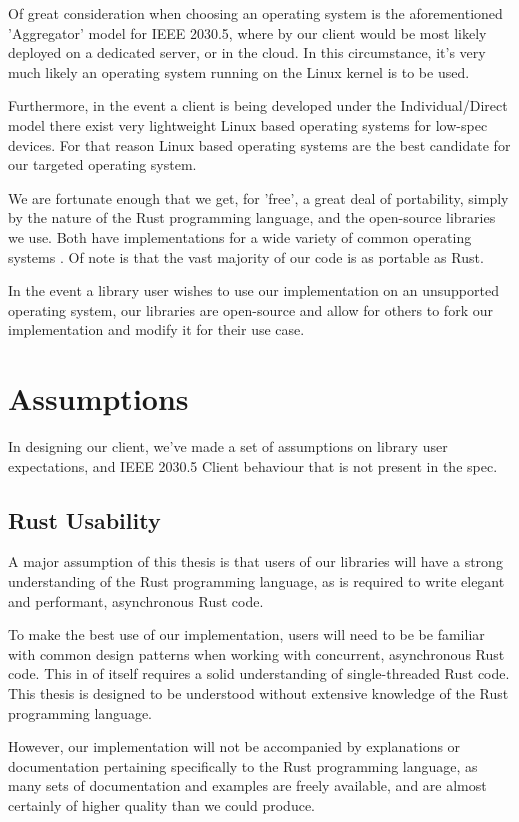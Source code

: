 Of great consideration when choosing an operating system is the aforementioned 'Aggregator' model for IEEE 2030.5, where by our client would be most likely deployed on a dedicated server, or in the cloud. In this circumstance, it's very much likely an operating system running on the Linux kernel is to be used.

Furthermore, in the event a client is being developed under the Individual/Direct model there exist very lightweight Linux based operating systems for low-spec devices. For that reason Linux based operating systems are the best candidate for our targeted operating system.

We are fortunate enough that we get, for 'free', a great deal of portability, simply by the nature of the Rust programming language, and the open-source libraries we use. Both have implementations for a wide variety of common operating systems \cite{RustPlatforms} \cite{TokioDocs}. Of note is that the vast majority of our code is as portable as Rust.

In the event a library user wishes to use our implementation on an unsupported operating system, our libraries are open-source and allow for others to fork our implementation and modify it for their use case.
    
\section{Assumptions}
In designing our client, we've made a set of assumptions on library user expectations, and IEEE 2030.5 Client behaviour that is not present in the spec.

\subsection{Rust Usability}
A major assumption of this thesis is that users of our libraries will have a strong understanding of the Rust programming language, as is required to write elegant and performant, asynchronous Rust code.

To make the best use of our implementation, users will need to be be familiar with common design patterns when working with concurrent, asynchronous Rust code. This in of itself requires a solid understanding of single-threaded Rust code. This thesis is designed to be understood without extensive knowledge of the Rust programming language.

However, our implementation will not be accompanied by explanations or documentation pertaining specifically to the Rust programming language, as many sets of documentation and examples are freely available, and are almost certainly  of higher quality than we could produce. 


